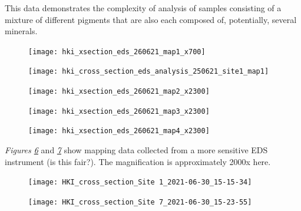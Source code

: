 This data demonstrates the complexity of analysis of samples consisting of a mixture of different pigments that are also each composed of, potentially, several minerals.



\begin{figure}[H]
\centering
  \texttt{[image: hki\_xsection\_eds\_260621\_map1\_x700]}
\label{fig:xsection_map1}
\end{figure}

\begin{figure}[H]
\centering
  \texttt{[image: hki\_cross\_section\_eds\_analysis\_250621\_site1\_map1]}
\label{fig:xsection_map2}
\end{figure}

\begin{figure}[H]
\centering
  \texttt{[image: hki\_xsection\_eds\_260621\_map2\_x2300]}
\label{fig:xsection_map3}
\end{figure}

\begin{figure}[H]
\centering
  \texttt{[image: hki\_xsection\_eds\_260621\_map3\_x2300]}
\label{fig:xsection_map4}
\end{figure}

\begin{figure}[H]
\centering
  \texttt{[image: hki\_xsection\_eds\_260621\_map4\_x2300]}
\label{fig:xsection_map5}
\end{figure}

\textit{Figures \ref{fig:xsection_map6}} and \textit{\ref{fig:xsection_map7}} show mapping data collected from a more sensitive EDS instrument (is this fair?). The magnification is approximately 2000x here.

\begin{figure}[H]
\centering
  \texttt{[image: HKI\_cross\_section\_Site 1\_2021-06-30\_15-15-34]}
\label{fig:xsection_map6}
\end{figure}

\begin{figure}[H]
\centering
  \texttt{[image: HKI\_cross\_section\_Site 7\_2021-06-30\_15-23-55]}
\label{fig:xsection_map7}
\end{figure}




